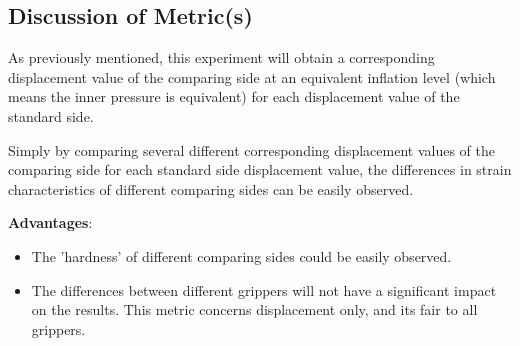 \documentclass[conference]{IEEEtran}
\begin{document}
\subsection{Discussion of Metric(s)}

As previously mentioned, this experiment will obtain a corresponding displacement value of the comparing side at an equivalent inflation level (which means the inner pressure is equivalent) for each displacement value of the standard side.

 Simply by comparing  several different corresponding displacement values of the comparing side for each standard side displacement value, the differences in strain characteristics of different comparing sides can be easily observed.

 \textbf{Advantages}:
 \begin{itemize}
     \item The 'hardness' of different comparing sides could be easily observed.
     \item The differences between different grippers will not have a significant impact on the results. This metric concerns displacement only, and its fair to all grippers.
 \end{itemize}
 
\end{document}
